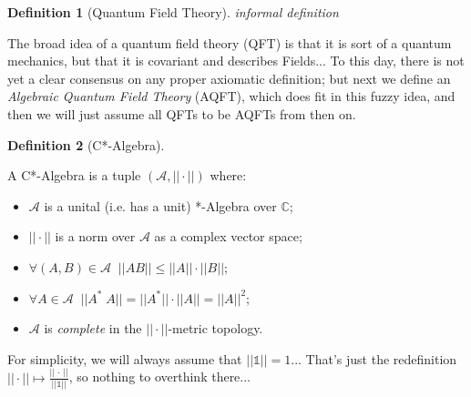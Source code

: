 \documentclass[a4paper,11pt]{article}
\numberwithin{equation}{section}
\theoremstyle{definition}
\newtheorem{definition}{Definition}
\newtheorem{comment}{Comment}
\begin{document}
\begin{definition}[Quantum Field Theory] \emph{informal definition}

    The broad idea of a quantum field theory (QFT) is that it is sort of a quantum mechanics, but that it is covariant and describes Fields...
    To this day, there is not yet a clear consensus on any proper axiomatic definition; but next we define an \emph{Algebraic Quantum Field Theory} (AQFT), which does fit in this fuzzy idea, and then we will just assume all QFTs to be AQFTs from then on.
\end{definition}
\begin{definition}[C*-Algebra]
    $\quad$
    
    A C*-Algebra is a tuple $(\mathcal{A}, ||\cdot||)$ where:
    \begin{itemize}
        \item $\mathcal{A}$ is a unital (i.e. has a unit) *-Algebra over $\mathbb{C}$;
        \item $||\cdot||$ is a norm over $\mathcal{A}$ as a complex vector space;
        \item $\forall (A,B)\in\mathcal{A}\;\; ||AB||\leq||A||\cdot||B||;$
        \item $\forall A\in\mathcal{A}\;\; ||A^*\; A||=||A^*||\cdot||A||=||A||^2;$
        \item $\mathcal{A}$ is \emph{complete} in the $||\cdot||$-metric topology.
    \end{itemize} 
    
For simplicity, we will always assume that $||\mathds{1}||=1$... That's just the redefinition $||\cdot||\mapsto\frac{||\,\cdot\,||}{||\mathds{1}||}$, so nothing to overthink there...
\end{definition}

\end{document}
